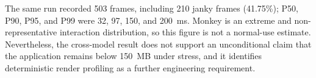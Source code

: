 The same run recorded 503 frames, including 210 janky frames (41.75\%); P50, P90, P95, and P99 were 32, 97, 150, and 200~ms. Monkey is an extreme and non-representative interaction distribution, so this figure is not a normal-use estimate. Nevertheless, the cross-model result does not support an unconditional claim that the application remains below 150~MB under stress, and it identifies deterministic render profiling as a further engineering requirement.
